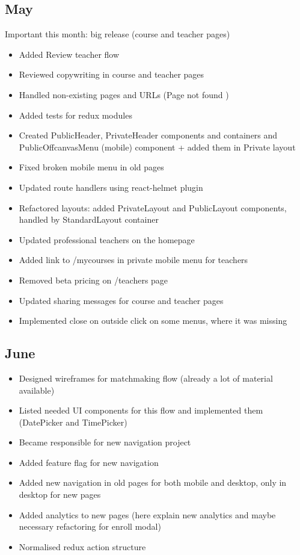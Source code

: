 \subsection{May}
\label{ssec:may}

Important this month: big release (course and teacher pages)

\begin{itemize}
\item Added \guillemotleft Review teacher \guillemotright flow
\item Reviewed copywriting in course and teacher pages
\item Handled non-existing pages and URLs (\guillemotleft Page not found \guillemotright)
\item Added tests for redux modules
\item Created PublicHeader, PrivateHeader components and containers and PublicOffcanvasMenu (mobile) component + added them in Private layout
\item Fixed broken mobile menu in old pages
\item Updated route handlers using react-helmet plugin
\item Refactored layouts: added PrivateLayout and PublicLayout components, handled by StandardLayout container
\item Updated professional teachers on the homepage
\item Added link to /mycourses in private mobile menu for teachers
\item Removed beta pricing on /teachers page
\item Updated sharing messages for course and teacher pages
\item Implemented close on outside click on some menus, where it was missing
\end{itemize}

\subsection{June}
\label{ssec:june}

\begin{itemize}
\item Designed wireframes for matchmaking flow (already a lot of material available)
\item Listed needed UI components for this flow and implemented them (DatePicker and TimePicker)
\item Became responsible for new navigation project
\item Added feature flag for new navigation
\item Added new navigation in old pages for both mobile and desktop, only in desktop for new pages
\item Added analytics to new pages (here explain new analytics and maybe necessary refactoring for enroll modal)
\item Normalised redux action structure
\end{itemize}

